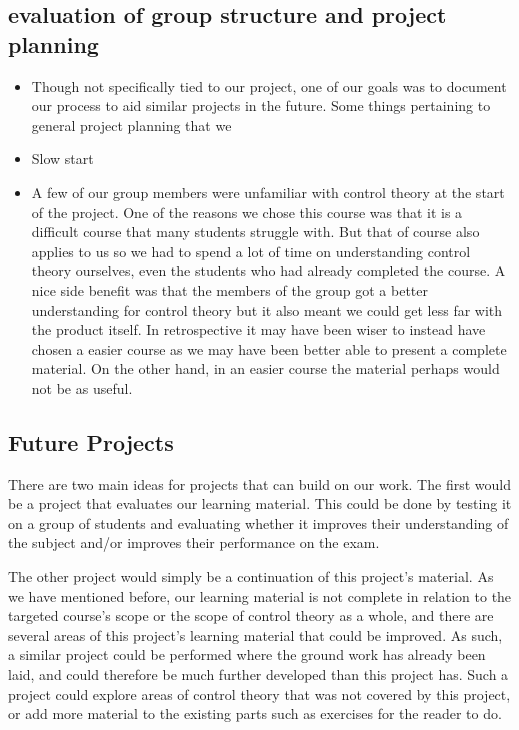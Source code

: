 \subsection{evaluation of group structure and project planning}
\begin{itemize}
\item Though not specifically tied to our project, one of our goals was to document our process to aid similar projects in the future. Some things pertaining to general project planning that we 



\item Slow start

\item A few of our group members were unfamiliar with control theory at the start of the project. One of the reasons we chose this course was that it is a difficult course that many students struggle with. But that of course also applies to us so we had to spend a lot of time on understanding control theory ourselves, even the students who had already completed the course. A nice side benefit was that the members of the group got a better understanding for control theory but it also meant we could get less far with the product itself. In retrospective it may have been wiser to instead have chosen a easier course as we may have been better able to present a complete material. On the other hand, in an easier course the material perhaps would not be as useful.
\end{itemize}
\fi
\subsection{Future Projects}
There are two main ideas for projects that can build on our work. The first would be a project that evaluates our learning material. This could be done by testing it on a group of students and evaluating whether it improves their understanding of the subject and/or improves their performance on the exam. 

The other project would simply be a continuation of this project's material. As we have mentioned before, our learning material is not complete in relation to the targeted course's scope or the scope of control theory as a whole, and there are several areas of this project's learning material that could be improved. As such, a similar project could be performed where the ground work has already been laid, and could therefore be much further developed than this project has. Such a project could explore areas of control theory that was not covered by this project, or add more material to the existing parts such as exercises for the reader to do. 

